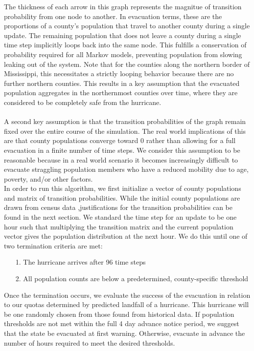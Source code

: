 \documentclass[titlepage]{article}
\begin{document}
    The thickness of each arrow in this graph represents the magnitue of transition probability from one node to another. In evacuation terms, these are the proportions of a county's population that travel to another county during a single update. The remaining population that does not leave a county during a single time step implicitly loops back into the same node. This fulfills a conservation of probability required for all Markov models, preventing population from slowing leaking out of the system. Note that for the counties along the northern border of Mississippi, this necessitates a strictly looping behavior because there are no further northern counties. This results in a key assumption that the evacuated population aggregates in the northernmost counties over time, where they are considered to be completely safe from the hurricane. \\
    \\
    A second key assumption is that the transition probabilities of the graph remain fixed over the entire course of the simulation. The real world implications of this are that county populations converge toward 0 rather than allowing for a full evacuation in a finite number of time steps. We consider this assumption to be reasonable because in a real world scenario it becomes increasingly difficult to evacuate straggling population members who have a reduced mobility due to age, poverty, and/or other factors. \\

    In order to run this algorithm, we first initialize a vector of county populations and matrix of transition probabilities. While the initial county populations are drawn from census data \cite{census},justifications for the transition probabilities can be found in the next section. We standard the time step for an update to be one hour such that multiplying the transition matrix and the current population vector gives the population distribution at the next hour. We do this until one of two termination criteria are met:
    \begin{itemize}
      \item[1.]
        The hurricane arrives after 96 time steps
      \item[2.]
        All population counts are below a predetermined, county-specific threshold
    \end{itemize}

    Once the termination occurs, we evaluate the success of the evacuation in relation to our quotas determined by predicted landfall of a hurricane. This hurricane will be one randomly chosen from those found from historical data. If population thresholds are not met within the full 4 day advance notice period, we suggest that the state be evacuated at first warning. Otherwise, evacuate in advance the number of hours required to meet the desired thresholds.
\end{document}
